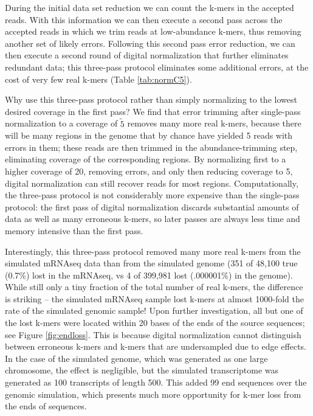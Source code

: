 \documentclass[10pt]{article}
\begin{document}
During the initial data set reduction we can count the k-mers in the
accepted reads.  With this information we can then execute a second pass
across the accepted reads in which we trim reads at low-abundance
k-mers, thus removing another set of likely errors.  Following this
second pass error reduction, we can then execute a second round of
digital normalization that further eliminates redundant data; this
three-pass protocol eliminates some additional errors, at the cost of
very few real k-mers (Table \ref{tab:normC5}).

Why use this three-pass protocol rather than simply normalizing to the
lowest desired coverage in the first pass?  We find that error
trimming after single-pass normalization to a coverage of $\tilde 5$
removes many more real k-mers, because there will be many regions in
the genome that by chance have yielded 5 reads with errors in them;
these reads are then trimmed in the abundance-trimming step,
eliminating coverage of the corresponding regions.  By normalizing
first to a higher coverage of 20, removing errors, and only then
reducing coverage to 5, digital normalization can still recover reads
for most regions.  Computationally, the three-pass protocol is not
considerably more expensive than the single-pass protocol: the first
pass of digital normalization discards substantial amounts of data as
well as many erroneous k-mers, so later passes are always less time
and memory intensive than the first pass.

Interestingly, this three-pass protocol removed many more real k-mers
from the simulated mRNAseq data than from the simulated genome (351 of
48,100 true (0.7\%) lost in the mRNAseq, vs 4 of 399,981 lost
(.000001\%) in the genome).  While still only a tiny fraction of the
total number of real k-mers, the difference is striking -- the
simulated mRNAseq sample lost k-mers at almost 1000-fold the rate of
the simulated genomic sample!  Upon further investigation, all but one
of the lost k-mers were located within 20 bases of the ends of the
source sequences; see Figure \ref{fig:endloss}.  This is because
digital normalization cannot distinguish between erroneous k-mers and
k-mers that are undersampled due to edge effects.  In the case of the
simulated genome, which was generated as one large chromosome, the
effect is negligible, but the simulated transcriptome was generated as
100 transcripts of length 500.  This added 99 end sequences over the
genomic simulation, which presents much more opportunity for k-mer
loss from the ends of sequences.
\end{document}
